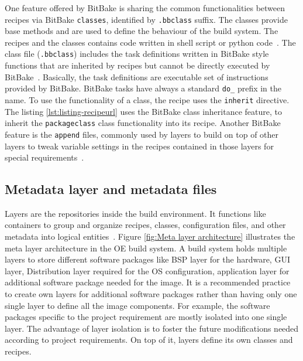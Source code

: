 One feature offered by BitBake is sharing the common functionalities between recipes via BitBake \texttt{classes}, identified by \texttt{.bbclass} suffix. The classes provide base methods and are used to define the behaviour of the build system. The recipes and the classes contains code written in shell script or python code~\parencite{salvador2014embedded}. The class file (\texttt{.bbclass}) includes the task definitions written in BitBake style functions that are inherited by recipes but cannot be directly executed by BitBake~\parencite{violanteembedded}. Basically, the task definitions are executable set of instructions provided by BitBake. BitBake tasks have always a standard \texttt{do\_} prefix in the name. To use the functionality of a class, the recipe uses the \texttt{inherit} directive. The listing \ref{lst:listing-recipeurl} uses the BitBake class inheritance feature, to inherit the \texttt{packageclass} class functionality into its recipe. Another BitBake feature is the \texttt{append} files, commonly used by layers to build on top of other layers to tweak variable settings in the recipes contained in those layers for special requirements~\parencite{Reference1}.

\subsection{Metadata layer and metadata files}

Layers are the repositories inside the build environment. It functions like containers to group and organize recipes, classes, configuration files, and other metadata into logical entities~\parencite{Reference1}. Figure \ref{fig:Meta layer architecture} illustrates the meta layer architecture in the \ac{OE} build system. A build system holds multiple layers to store different software packages like \ac{BSP} layer for the hardware, \ac{GUI} layer, Distribution layer required for the OS configuration, application layer for additional software package needed for the image. It is a recommended practice to create own layers for additional software packages rather than having only one single layer to define all the image components. For example, the software packages specific to the project requirement are mostly isolated into one single layer. The advantage of layer isolation is to foster the future modifications needed according to project requirements. On top of it, layers define its own classes and recipes.

